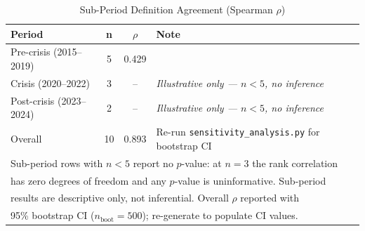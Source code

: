 \begin{table}[ht]
\caption{Sub-Period Definition Agreement (Spearman $\rho$)}
\label{tab:spearman_subperiod}
\footnotesize
\begin{tabular}{lccl}
\toprule
\textbf{Period} & \textbf{n} & \textbf{$\rho$} & \textbf{Note}\\
\midrule
Pre-crisis (2015--2019) & 5 & 0.429 & \\
Crisis (2020--2022) & 3 & -- & \textit{Illustrative only --- $n < 5$, no inference}\\
Post-crisis (2023--2024) & 2 & -- & \textit{Illustrative only --- $n < 5$, no inference}\\
\midrule
Overall & 10 & 0.893 & Re-run \texttt{sensitivity\_analysis.py} for bootstrap CI\\
\bottomrule
\multicolumn{4}{l}{\scriptsize Sub-period rows with $n<5$ report no $p$-value: at $n=3$ the rank correlation}\\
\multicolumn{4}{l}{\scriptsize has zero degrees of freedom and any $p$-value is uninformative. Sub-period}\\
\multicolumn{4}{l}{\scriptsize results are descriptive only, not inferential. Overall $\rho$ reported with}\\
\multicolumn{4}{l}{\scriptsize 95\% bootstrap CI ($n_{\text{boot}}=500$); re-generate to populate CI values.}\\
\end{tabular}
\end{table}
